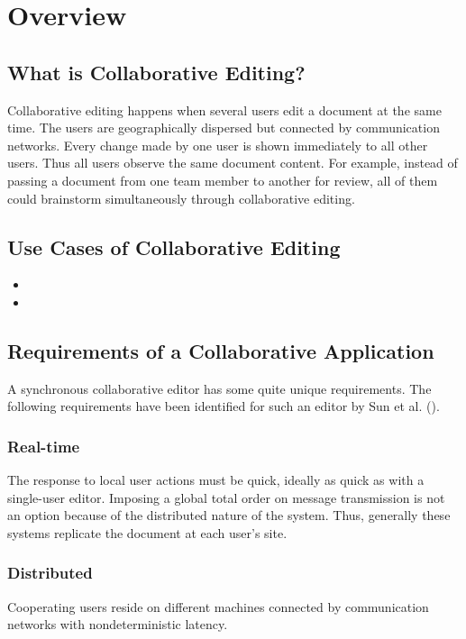 \chapter{Overview}
\label{chapter:overview}



\section{What is Collaborative Editing?}
Collaborative editing happens when several users edit a document at the same time. The users are geographically dispersed but connected by communication networks. Every change made by one user is shown immediately to all other users. Thus all users observe the same document content. For example, instead of passing a document from one team member to another for review, all of  them could brainstorm simultaneously through collaborative editing.


\section{Use Cases of Collaborative Editing}

\begin{itemize}
\item 
\item 
\end{itemize}



 
 

\section{Requirements of a Collaborative Application}
A synchronous collaborative editor has some quite unique requirements.
The following requirements have been identified for such an editor
by Sun et al. (\cite{sun98a}).

\subsection{Real-time} 
The response to local user actions must be quick, ideally
as quick as with a single-user editor. Imposing a global total order on
message transmission is not
an option because of the distributed nature of the system. Thus, generally 
these systems replicate the document at each user's site.

\subsection{Distributed} 
Cooperating users reside on different machines 
connected by communication networks with nondeterministic latency.

